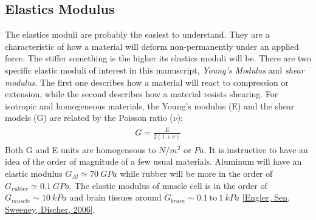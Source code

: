 \documentclass[A4paperpaper,11pt,english]{sphinxmanual}
\begin{document}
\subsection{Elastics Modulus}
\label{index-latex:elastics-modulus}\label{index-latex:elastic-modulus}
The elastics moduli are probably the easiest to understand. They are
a characteristic of how a material will deform non-permanently under an applied
force. The stiffer something is the higher its elastics moduli will be. There
are two specific elastic moduli of interest in this
manuscript, \emph{Young's Modulus} and \emph{shear modulus}. The first one describes how a material will react to compression or extension, while the
second describes how a material resists  shearing. For isotropic and homogeneous
materials, the Young's modulus (E) and the shear models (G) are related
by the Poisson ratio (\(\nu\)):
\label{index-latex:equation-eqa7}\begin{gather}
\begin{split}G = \frac{E}{2(1+\nu)}\end{split}\label{index-latex-eqa7}
\end{gather}
Both G and E units are homogeneous to \(N/m^2\) or
\(Pa\).  It is instructive to have an idea of the order of magnitude of a
few usual materials. Aluminum will have an elastic modulus \(G_{Al}\simeq
70~GPa\) while rubber will be more in the order of \(G_{rubber}\simeq
0.1~GPa\). The elastic modulus of muscle cell is in the order of
\(G_{muscle} \sim 10~kPa\) and brain tissues around \(G_{brain} \sim
0.1~\text{to}~1~kPa\) {\hyperref[index-latex:engler2006]{{[}Engler, Sen, Sweeney, Discher,  2006{]}}}.
\end{document}
